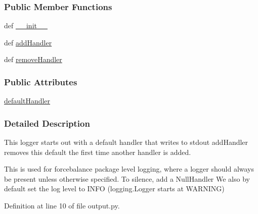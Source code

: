 \subsubsection*{Public Member Functions}
\begin{DoxyCompactItemize}
\item 
def \hyperlink{classforcebalance_1_1output_1_1ForceBalanceLogger_aebc2ee02e48bab63b37dfbe1f8db5683}{\-\_\-\-\_\-init\-\_\-\-\_\-}
\item 
def \hyperlink{classforcebalance_1_1output_1_1ForceBalanceLogger_a7c6325e6fc8f6c99ef8ea9a3a3acff77}{add\-Handler}
\item 
def \hyperlink{classforcebalance_1_1output_1_1ForceBalanceLogger_ad8aa2fcfa32166607ee3d0cb0dcebd2d}{remove\-Handler}
\end{DoxyCompactItemize}
\subsubsection*{Public Attributes}
\begin{DoxyCompactItemize}
\item 
\hyperlink{classforcebalance_1_1output_1_1ForceBalanceLogger_a98390245191cb70e88ef22816959aa2c}{default\-Handler}
\end{DoxyCompactItemize}


\subsubsection{Detailed Description}
This logger starts out with a default handler that writes to stdout add\-Handler removes this default the first time another handler is added. 

This is used for forcebalance package level logging, where a logger should always be present unless otherwise specified. To silence, add a Null\-Handler We also by default set the log level to I\-N\-F\-O (logging.\-Logger starts at W\-A\-R\-N\-I\-N\-G) 

Definition at line 10 of file output.\-py.



